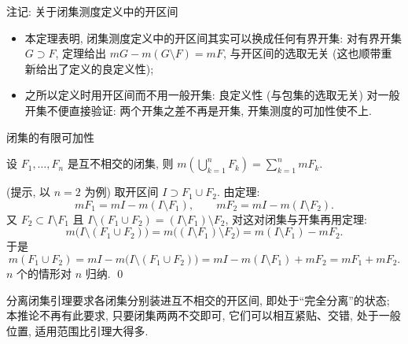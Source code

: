 
\begin{frame}{注记: 关于闭集测度定义中的开区间}

{
\larger[1]

\begin{itemize}[<+->]
\item 本定理表明, 闭集测度定义中的\alert{开区间其实可以换成任何有界开集}: 对有界开集 $G \supset F$, 定理给出 $m G - m (G \setminus F) = m F$, 与开区间的选取无关 (这也顺带重新给出了定义的\alert{良定义性});
\vspace{1em}
\item 之所以定义时用开区间而不用一般开集: \alert{良定义性} (与包集的选取无关) 对一般开集\alert{不便直接验证}: 两个开集之差不再是开集, 开集测度的可加性使不上.
\end{itemize}
}

\end{frame}


\begin{frame}{闭集的有限可加性}

\begin{cor}[闭集的有限可加性]
设 $F_1, \ldots, F_n$ 是互不相交的闭集, 则 $m\left(\bigcup_{k=1}^n F_k\right) = \sum_{k=1}^n m F_k$.
\end{cor}

\pause

\startproof[bg=yellow, fg=red](提示, 以 $n = 2$ 为例)
取开区间 $I \supset F_1 \cup F_2$. 由定理:
\[
m F_1 = m I - m(I \setminus F_1), \qquad m F_2 = m I - m(I \setminus F_2).
\]
又 $F_2 \subset I \setminus F_1$ 且 $I \setminus (F_1 \cup F_2) = (I \setminus F_1) \setminus F_2$, 对这对闭集与开集再用定理:
\[
m\big(I \setminus (F_1 \cup F_2)\big) = m\big((I \setminus F_1) \setminus F_2\big) = m(I \setminus F_1) - m F_2 .
\]
于是
\[
m (F_1 \cup F_2) = m I - m\big(I \setminus (F_1 \cup F_2)\big) = m I - m(I \setminus F_1) + m F_2 = m F_1 + m F_2 .
\]
$n$ 个的情形对 $n$ 归纳.
\qed

\begin{remark}
分离闭集引理要求各闭集分别装进互不相交的开区间, 即处于``完全分离''的状态; 本推论不再有此要求, 只要闭集\alert{两两不交}即可, 它们可以相互紧贴、交错, 处于一般位置, 适用范围比引理大得多.
\end{remark}

\end{frame}


